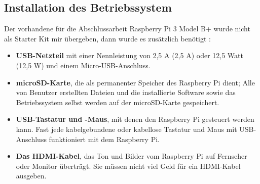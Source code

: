 \subsection{Installation des Betriebssystem}
\label{sec:register_client:raspbian}
Der vorhandene für die Abschlussarbeit Raspberry Pi 3 Model B+ wurde nicht als Starter Kit mir übergeben, dann wurde es zusätzlich benötigt \cite[pp. 21-22]{gareth:raspi}: 
\begin{itemize}
	\item \textbf{USB-Netzteil} mit einer Nennleistung von 2,5 A (2,5 A) oder 12,5 Watt (12,5 W) und einem Micro-USB-Anschluss. 
	\item \textbf{microSD-Karte}, die als permanenter Speicher des Raspberry Pi dient; Alle von Benutzer erstellten Dateien und die installierte Software sowie das Betriebssystem selbst werden auf der microSD-Karte gespeichert.
	\item \textbf{USB-Tastatur und -Maus}, mit denen den Raspberry Pi gesteuert werden kann. Fast jede kabelgebundene oder kabellose Tastatur und Maus mit USB-Anschluss funktioniert mit dem Raspberry Pi.
	\item \textbf{Das HDMI-Kabel}, das Ton und Bilder vom Raspberry Pi auf Fernseher oder Monitor überträgt. Sie müssen nicht viel Geld für ein HDMI-Kabel ausgeben. 
\end{itemize}

